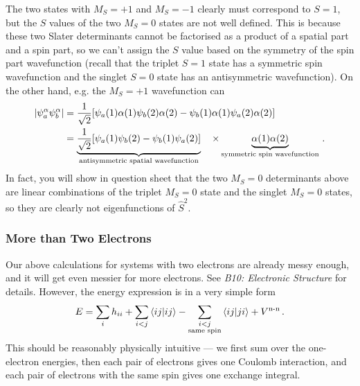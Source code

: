 \documentclass{article}
\theoremstyle{plain}\theoremheaderfont{\normalfont\itshape}\theorembodyfont{\rmfamily}\theoremseparator{.}\newtheorem*{rem}{Remark}\newtheorem*{ex}{Example}\newtheorem*{proof}{Proof}\newtheorem*{altp}{Alternative proof}
\theoremstyle{plain}\theoremheaderfont{\normalfont\bfseries}\theorembodyfont{\rmfamily}\theoremseparator{.}\newtheorem{thm}{Theorem}[section]\newtheorem{lem}[thm]{Lemma}\newtheorem{prop}[thm]{Proposition}\newtheorem*{cor}{Corollary}\newtheorem{defn}[thm]{Definition}\newtheorem{clm}[thm]{Claim}\newtheorem{clminproof}{Claim}\newtheorem{pos}{Postulate}[section]
\theoremstyle{break}\theoremheaderfont{\normalfont\itshape}\theorembodyfont{\rmfamily}\theoremseparator{.\medskip}\newtheorem*{proofskip}{Proof}\newtheorem*{exs}{Examples}\newtheorem*{rems}{Remarks}
\theoremstyle{break}\theoremheaderfont{\normalfont\bfseries}\theorembodyfont{\rmfamily}\theoremseparator{.\medskip}\newtheorem{lemskip}[thm]{Lemma}\newtheorem{defnskip}[thm]{Definition}\newtheorem{propskip}[thm]{Proposition}\newtheorem{thmskip}[thm]{Theorem}
\numberwithin{equation}{section}
\newcommand{\braket}[2]{\left\langle #1 \middle| #2 \right\rangle}
\newcommand{\abs}[1]{\left| #1 \right|}
\begin{document}
    The two states with \(M_S=+1\) and \(M_S=-1\) clearly must correspond to \(S=1\), but the \(S\) values of the two \(M_S=0\) states are not well defined. This is because these two Slater determinants cannot be factorised as a product of a spatial part and a spin part, so we can't assign the \(S\) value based on the symmetry of the spin part wavefunction (recall that the triplet \(S=1\) state has a symmetric spin wavefunction and the singlet \(S=0\) state has an antisymmetric wavefunction). On the other hand, e.g. the \(M_S=+1\) wavefunction can
    \begin{align}
        \abs{\psi_a^\alpha\psi_b^\alpha}&=\frac{1}{\sqrt{2}}[\psi_a(1)\alpha(1)\psi_b(2)\alpha(2)-\psi_b(1)\alpha(1)\psi_a(2)\alpha(2)]\notag\\
        &=\underbrace{\frac{1}{\sqrt{2}}[\psi_a(1)\psi_b(2)-\psi_b(1)\psi_a(2)]}_{\text{antisymmetric spatial wavefunction}}\quad\times \underbrace{\alpha(1)\alpha(2)}_{\text{symmetric spin wavefunction}}\,.
    \end{align}
    In fact, you will show in question sheet that the two \(M_S=0\) determinants above are linear combinations of the triplet \(M_S=0\) state and the singlet \(M_S=0\) states, so they are clearly not eigenfunctions of \(\hat{S}^2\).

    \subsubsection{More than Two Electrons}
    Our above calculations for systems with two electrons are already messy enough, and it will get even messier for more electrons. See \textit{B10: Electronic Structure} for details. However, the energy expression is in a very simple form
    \begin{equation}
        E=\sum_{i}h_{ii}+\sum_{i<j}\braket{ij}{ij}-\sum_{\begin{subarray}{c}
            i < j \\ \text{same spin}
        \end{subarray}}\braket{ij}{ji}+V^{\text{n-n}}\,.
    \end{equation}
    This should be reasonably physically intuitive --- we first sum over the one-electron energies, then each pair of electrons gives one Coulomb interaction, and each pair of electrons with the same spin gives one exchange integral.
\end{document}
